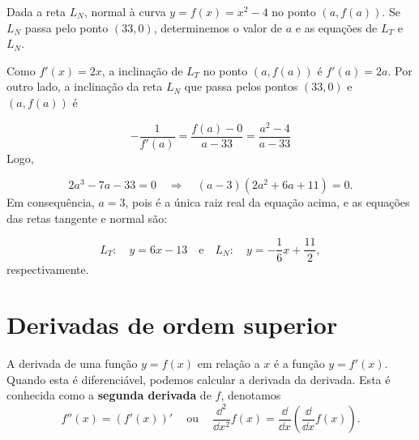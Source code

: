 \cleardoublepage\documentclass[../main.tex]{subfiles}
\begin{document}
\begin{ex}
  Dada a reta \(L_N\), normal à curva \(y=f(x)=x^2-4\) no ponto \((a,f(a))\). Se \(L_N\) passa pelo ponto \((33,0)\), determinemos o valor de \(a\) e as equações de \(L_T\) e \(L_N\).

\begin{solution}
Como \(f'(x)=2x\), a inclinação de \( L_{T}\) no ponto \((a,f(a))\) é \( f'(a)=2a\). Por outro lado, a inclinação da reta \(L_N\) que passa pelos pontos \((33,0)\) e \((a,f(a))\) é

\[ -\dfrac{1}{f'(a)}= \dfrac{f(a)-0}{a-33}=\dfrac{a^2-4}{a-33} \]
Logo,

\[ 2a^3-7a-33=0\quad\Rightarrow\quad (a-3)(2a^2+6a+11)=0. \]
Em consequência, \(a=3\), pois é a única raiz real da equação acima, e as equações das retas tangente e normal são:

\[ L_T: \quad y=6x-13\quad \mbox{e}\quad L_N: \quad y=-\dfrac{1}{6}x+\dfrac{11}{2}, \]
respectivamente.
\end{solution}

\end{ex}
\hypertarget{DerivOrdemSup}{\section{Derivadas de ordem superior}}\label{sec:DerivOrdemSuperior}

A derivada de uma função $y = f(x)$ em relação a $x$ é a função $y = f'(x)$. Quando esta é diferenciável, podemos calcular a derivada da derivada. Esta é conhecida como a {\bf segunda derivada} de $f$, denotamos
\begin{equation}
  f''(x) = (f'(x))' ~\quad \text{ou} ~\quad \frac{\dd^2}{\dd x^2}f(x) = \frac{\dd}{\dd x}\left(\frac{\dd}{\dd x}f(x)\right).
\end{equation}
\end{document}
